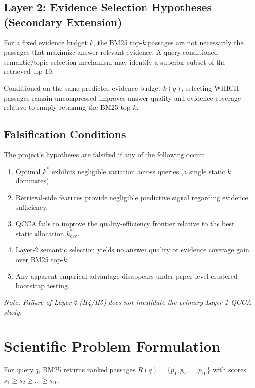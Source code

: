 \documentclass[11pt,a4paper]{article}
\begin{document}
\subsection{Layer 2: Evidence Selection Hypotheses (Secondary Extension)}
\begin{hypothesisbox}
For a fixed evidence budget $k$, the BM25 top-$k$ passages are not necessarily the passages that maximize answer-relevant evidence. A query-conditioned semantic/topic selection mechanism may identify a superior subset of the retrieved top-10.
\end{hypothesisbox}

\begin{hypothesisbox}
Conditioned on the same predicted evidence budget $k(q)$, selecting WHICH passages remain uncompressed improves answer quality and evidence coverage relative to simply retaining the BM25 top-$k$.
\end{hypothesisbox}

\subsection{Falsification Conditions}
The project's hypotheses are falsified if any of the following occur:
\begin{enumerate}[label=(\alph*)]
    \item Optimal $k^*$ exhibits negligible variation across queries (a single static $k$ dominates).
    \item Retrieval-side features provide negligible predictive signal regarding evidence sufficiency.
    \item QCCA fails to improve the quality-efficiency frontier relative to the best static allocation $k_{\text{dev}}^*$.
    \item Layer-2 semantic selection yields no answer quality or evidence coverage gain over BM25 top-$k$.
    \item Any apparent empirical advantage disappears under paper-level clustered bootstrap testing.
\end{enumerate}
\textit{Note: Failure of Layer 2 (H4/H5) does not invalidate the primary Layer-1 QCCA study.}

\section{Scientific Problem Formulation}
For query $q$, BM25 returns ranked passages $R(q) = \{p_1, p_2, \dots, p_{10}\}$ with scores $s_1 \ge s_2 \ge \dots \ge s_{10}$.
\end{document}
